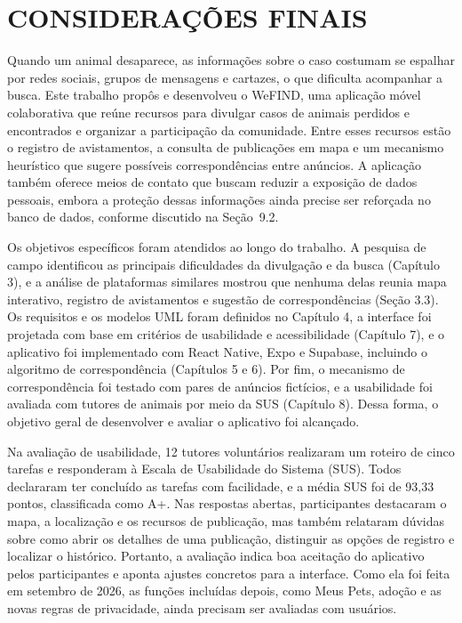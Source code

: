 \section{CONSIDERAÇÕES FINAIS}

Quando um animal desaparece, as informações sobre o caso costumam se espalhar por redes sociais, grupos de mensagens e cartazes, o que dificulta acompanhar a busca. Este trabalho propôs e desenvolveu o WeFIND, uma aplicação móvel colaborativa que reúne recursos para divulgar casos de animais perdidos e encontrados e organizar a participação da comunidade. Entre esses recursos estão o registro de avistamentos, a consulta de publicações em mapa e um mecanismo heurístico que sugere possíveis correspondências entre anúncios. A aplicação também oferece meios de contato que buscam reduzir a exposição de dados pessoais, embora a proteção dessas informações ainda precise ser reforçada no banco de dados, conforme discutido na Seção~9.2.

Os objetivos específicos foram atendidos ao longo do trabalho. A pesquisa de campo identificou as principais dificuldades da divulgação e da busca (Capítulo 3), e a análise de plataformas similares mostrou que nenhuma delas reunia mapa interativo, registro de avistamentos e sugestão de correspondências (Seção 3.3). Os requisitos e os modelos UML foram definidos no Capítulo 4, a interface foi projetada com base em critérios de usabilidade e acessibilidade (Capítulo 7), e o aplicativo foi implementado com React Native, Expo e Supabase, incluindo o algoritmo de correspondência (Capítulos 5 e 6). Por fim, o mecanismo de correspondência foi testado com pares de anúncios fictícios, e a usabilidade foi avaliada com tutores de animais por meio da SUS (Capítulo 8). Dessa forma, o objetivo geral de desenvolver e avaliar o aplicativo foi alcançado.

Na avaliação de usabilidade, 12 tutores voluntários realizaram um roteiro de cinco tarefas e responderam à Escala de Usabilidade do Sistema (SUS). Todos declararam ter concluído as tarefas com facilidade, e a média SUS foi de 93,33 pontos, classificada como A+. Nas respostas abertas, participantes destacaram o mapa, a localização e os recursos de publicação, mas também relataram dúvidas sobre como abrir os detalhes de uma publicação, distinguir as opções de registro e localizar o histórico. Portanto, a avaliação indica boa aceitação do aplicativo pelos participantes e aponta ajustes concretos para a interface. Como ela foi feita em setembro de 2026, as funções incluídas depois, como Meus Pets, adoção e as novas regras de privacidade, ainda precisam ser avaliadas com usuários.

